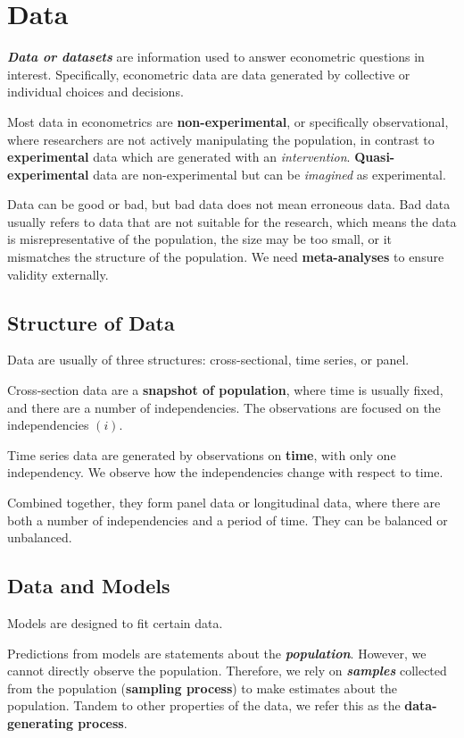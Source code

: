 \section{Data}
\begin{definition}
    \textbf{\textit{Data or datasets}} are information used to answer econometric questions in interest. Specifically, econometric data are data generated by collective or individual choices and decisions.
\end{definition}

Most data in econometrics are \textbf{non-experimental}, or specifically observational, where researchers are not actively manipulating the population, in contrast to \textbf{experimental} data which are generated with an \textit{intervention}. \textbf{Quasi-experimental} data are non-experimental but can be \textit{imagined} as experimental.

Data can be good or bad, but bad data does not mean erroneous data. Bad data usually refers to data that are not suitable for the research, which means the data is misrepresentative of the population, the size may be too small, or it mismatches the structure of the population. We need \textbf{meta-analyses} to ensure validity externally.

\subsection{Structure of Data}
Data are usually of three structures: cross-sectional, time series, or panel.

Cross-section data are a \textbf{snapshot of population}, where time is usually fixed, and there are a number of independencies. The observations are focused on the independencies $(i)$.

Time series data are generated by observations on \textbf{time}, with only one independency. We observe how the independencies change with respect to time.

Combined together, they form panel data or longitudinal data, where there are both a number of independencies and a period of time. They can be balanced or unbalanced.

\subsection{Data and Models}
Models are designed to fit certain data.

Predictions from models are statements about the \textbf{\textit{population}}. However, we cannot directly observe the population. Therefore, we rely on \textbf{\textit{samples}} collected from the population (\textbf{sampling process}) to make estimates about the population. Tandem to other properties of the data, we refer this as the \textbf{data-generating process}.

